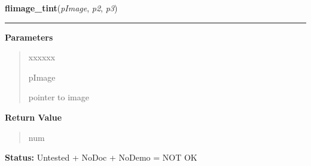 \hspace{.8\funcindent}\begin{boxedminipage}{\funcwidth}

    \raggedright \textbf{flimage\_tint}(\textit{pImage}, \textit{p2}, \textit{p3})

    \vspace{-1.5ex}

    \rule{\textwidth}{0.5\fboxrule}
\setlength{\parskip}{2ex}
\setlength{\parskip}{1ex}
      \textbf{Parameters}
      \vspace{-1ex}

      \begin{quote}
        \begin{Ventry}{xxxxxx}

          \item[pImage]

          pointer to image

        \end{Ventry}

      \end{quote}

      \textbf{Return Value}
    \vspace{-1ex}

      \begin{quote}
      num

      \end{quote}

\textbf{Status:} Untested + NoDoc + NoDemo = NOT OK



    \end{boxedminipage}

    \label{xformslib:library:flimage_rotate}

    \vspace{0.5ex}

